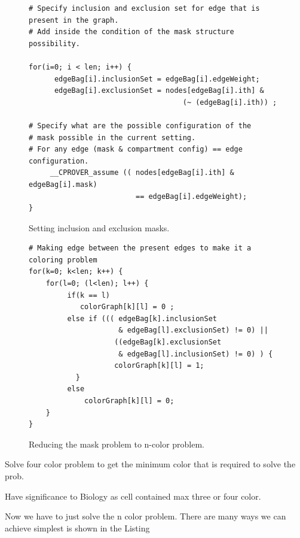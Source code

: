\documentclass[preprint,12pt]{elsarticle}
\begin{document}
\begin{figure}[ht]
\begin{verbatim}
# Specify inclusion and exclusion set for edge that is present in the graph.
# Add inside the condition of the mask structure possibility.
      
for(i=0; i < len; i++) {
      edgeBag[i].inclusionSet = edgeBag[i].edgeWeight;
      edgeBag[i].exclusionSet = nodes[edgeBag[i].ith] &
                                    (~ (edgeBag[i].ith)) ;
      
# Specify what are the possible configuration of the
# mask possible in the current setting.
# For any edge (mask & compartment config) == edge configuration. 
     __CPROVER_assume (( nodes[edgeBag[i].ith] & edgeBag[i].mask) 
                         == edgeBag[i].edgeWeight); 
}  
\end{verbatim}
\caption{Setting inclusion and exclusion masks.}
\label{code:motivate}
\end{figure}

\begin{figure}[ht]
\begin{verbatim}
# Making edge between the present edges to make it a coloring problem
for(k=0; k<len; k++) {
    for(l=0; (l<len); l++) {
         if(k == l) 
            colorGraph[k][l] = 0 ;
         else if ((( edgeBag[k].inclusionSet 
                     & edgeBag[l].exclusionSet) != 0) ||
                    ((edgeBag[k].exclusionSet
                     & edgeBag[l].inclusionSet) != 0) ) {
                    colorGraph[k][l] = 1;
		   }
		 else 
			 colorGraph[k][l] = 0; 
    }
} 
\end{verbatim}
\caption{Reducing the mask problem to n-color problem.}
\label{code:motivate}
\end{figure}


Solve four color problem to get the minimum color that is required to solve the prob.  

Have significance to Biology as cell contained max three or four color. 
     
     
Now we have to just solve the n color problem. There are many ways we can achieve simplest is shown in the Listing 
\end{document}
